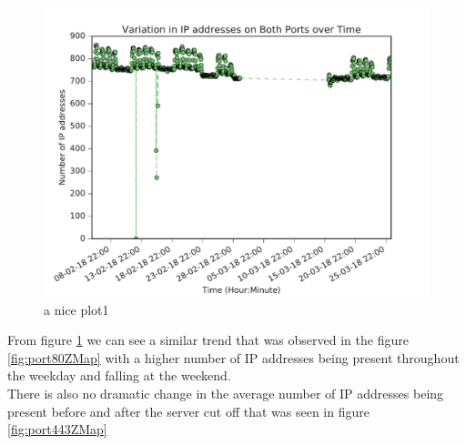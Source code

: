 \documentclass[a4wide,leqno,12pt]{report}
\begin{document}
\begin{figure}[H]
\centering
\includegraphics[scale=.5]{pdf_images/VariationInIpAddressesOnBothPortsOverTime}
\caption{a nice plot1}
\label{fig:portsBothZMap}
\end{figure}
From figure \ref{fig:portsBothZMap} we can see a similar trend that was observed in the figure \ref{fig:port80ZMap} with a higher number of IP addresses being present throughout the weekday and falling at the weekend.\\

There is also no dramatic change in the average number of IP addresses being present before and after the server cut off that was seen in figure \ref{fig:port443ZMap}
\end{document}

